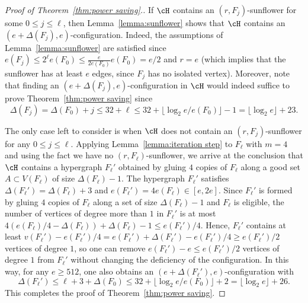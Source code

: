 \begin{proof}[Proof of Theorem~\ref{thm:power saving}.]
If $\cH$ contains an $(r, F_j)$-sunflower for some $0\leq j\leq \ell$, then Lemma~\ref{lemma:sunflower} shows that $\cH$ contains an $(e+\Delta(F_j), e)$-configuration. Indeed, the assumptions of Lemma~\ref{lemma:sunflower} are satisfied since $e(F_j)\leq 2^\ell e(F_0)\leq \frac{e}{2e(F_0)}e(F_0)=e/2$ and $r=e$ (which implies that the sunflower has at least $e$ edges, since $F_j$ has no isolated vertex). Moreover, note that finding an $(e+\Delta(F_j), e)$-configuration in $\cH$ would indeed suffice to prove Theorem~\ref{thm:power saving} since
\[\Delta(F_j)=\Delta(F_0)+j\leq 32+\ell\leq 32+\lfloor \log_2 e/e(F_0) \rfloor -1= \lfloor \log_2 e\rfloor +23.\]

The only case left to consider is when $\cH$ does not contain an $(r, F_j)$-sunflower for any $0\leq j\leq \ell$. Applying Lemma~\ref{lemma:iteration step} to $F_\ell$ with $m=4$ and using the fact we have no $(r, F_\ell)$-sunflower, we arrive at the conclusion that $\cH$ contains a hypergraph $F_\ell'$ obtained by gluing $4$ copies of $F_\ell$ along a good set $A\subset V(F_\ell)$ of size $\Delta(F_\ell)-1$. The hypergraph $F_\ell'$ satisfies $\Delta(F_\ell')=\Delta(F_\ell)+3$ and $e(F_\ell')=4e(F_\ell)\in [e, 2e]$. Since $F_\ell'$ is formed by gluing $4$ copies of $F_\ell$ along a set of size $\Delta(F_\ell)-1$ and $F_\ell$ is eligible, the number of vertices of degree more than $1$ in $F_\ell'$ is at most $4(e(F_\ell)/4-\Delta(F_\ell))+\Delta(F_\ell)-1\leq e(F_\ell')/4$. Hence, $F_\ell'$ contains at least $v(F_\ell')-e(F_\ell')/4 = e(F_\ell')+\Delta(F_\ell')-e(F_\ell')/4 \ge e(F_\ell')/2$ vertices of degree $1$, so one can remove $e(F_\ell')-e\leq e(F_\ell')/2$ vertices of degree $1$ from $F_\ell'$ without changing the deficiency of the configuration. In this way, for any $e \ge 512$, one also obtains an $(e+\Delta(F_\ell'), e)$-configuration with \[ \Delta(F_\ell')\leq \ell+3+\Delta(F_0)\leq 32+\lfloor \log_2 e/e(F_0)\rfloor+2= \lfloor \log_2 e\rfloor +26.\]
This completes the proof of Theorem~\ref{thm:power saving}.
\end{proof}
